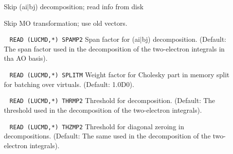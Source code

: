 \begin{description}
%
\item[] 
        Skip (ai$\mid$bj) decomposition; read info from disk
%
\item[] 
        Skip MO transformation; use old vectors.
%
\item[] \verb| |\newline
\verb|READ (LUCMD,*) SPAMP2|\newline
        Span factor for (ai$\mid$bj) decomposition. (Default: 
        The span factor used in the decomposition of
        the two-electron integrals in tha AO basis).
%
\item[] \verb| |\newline
\verb|READ (LUCMD,*) SPLITM|\newline
        Weight factor for Cholesky part in memory split for
        batching over virtuals. (Default: 1.0D0).
%
\item[] \verb| |\newline
\verb|READ (LUCMD,*) THRMP2|\newline
        Threshold for decomposition. (Default: 
        The threshold used in the decomposition of
        the two-electron integrals).
%
\item[] \verb| |\newline
\verb|READ (LUCMD,*) THZMP2|\newline
        Threshold for diagonal zeroing in decompositions. (Default: 
        The same used in the decomposition of
        the two-electron integrals).
%
\end{description}
